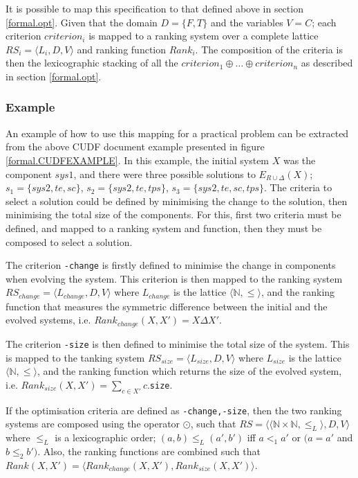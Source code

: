 It is possible to map this specification to that defined above in section \ref{formal.opt}.
Given that the domain $D = \{F,T\}$ and the variables $V = C$;
each criterion $criterion_i$ is mapped to a ranking system over a complete lattice $RS_i = \langle L_i,D,V \rangle$
and ranking function $Rank_i$.
The composition of the criteria is then the lexicographic stacking of all the $criterion_1 \oplus \ldots \oplus criterion_n$ as described in section \ref{formal.opt}.

\subsubsection{Example}
An example of how to use this mapping for a practical problem can be extracted from the above CUDF document example presented in figure \ref{formal.CUDFEXAMPLE}.
In this example, the initial system $X$ was the component $sys1$, and there were three possible solutions to $E_{R \cup \Delta}(X)$;
$s_1 = \{sys2, te, sc\}$,
$s_2 = \{sys2, te, tps\}$,
$s_3 = \{sys2, te, sc, tps\}$.
The criteria to select a solution could be defined by minimising the change to the solution, then minimising the total size of the components.
For this, first two criteria must be defined, and mapped to a ranking system and function, then they must be composed to select a solution.

The criterion \verb+-change+ is firstly defined to minimise the change in components when evolving the system.
This criterion is then mapped to the ranking system $RS_{change} = \langle L_{change},D,V \rangle$ where  $L_{change}$ is the lattice $\langle \mathbb{N}, \leq \rangle$,
and the ranking function that measures the symmetric difference between the initial and the evolved systems, i.e. $Rank_{change}(X,X') = X \Delta X'$.

The criterion \verb+-size+ is then defined to minimise the total size of the system.
This is mapped to the tanking system $RS_{size} = \langle L_{size},D,V \rangle$ where  $L_{size}$ is the lattice  $\langle \mathbb{N}, \leq \rangle$,
and the ranking function which returns the size of the evolved system, i.e.  $Rank_{size}(X,X') = \sum_{c \in X'} c$.\verb+size+.

If the optimisation criteria are defined as \verb+-change,-size+, then the two ranking systems are composed using the operator $\odot$,
such that $RS = \langle \langle \mathbb{N} \times \mathbb{N}, \leq_L \rangle, D, V \rangle$ where $\leq_L$ is a lexicographic order;
$(a,b) \leq_{L} (a',b')$ iff $a <_{1} a'$ or $(a = a'$ and $b \leq_{2} b')$.
Also, the ranking functions are combined such that $Rank(X,X') = \langle Rank_{change}(X,X'), Rank_{size}(X,X') \rangle$.

